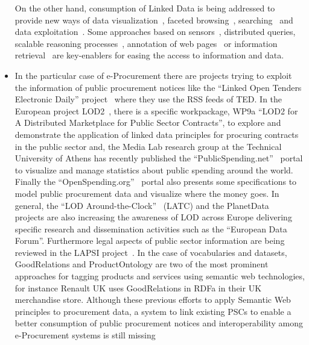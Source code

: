 \begin{itemize}
 On the other hand, consumption of Linked Data is being addressed to provide new ways of data 
 visualization~\cite{DBLP:journals/semweb/DadzieR11,hoga-etal-2011-swse-JWS}, faceted browsing~\cite{Pietriga06fresnel,citeulike:8529753}, 
 searching~\cite{hoga-etal-2011-swse-JWS} and data exploitation~\cite{Harth:2011:SIP:1963192.1963318}. Some approaches 
 based on sensors~\cite{Jeung:2010:EMM:1850003.1850235,ontology-search}, distributed queries\cite{Hartig09executingsparql,Ankolekar07thetwo,sparqlOpt}, 
 scalable reasoning processes~\cite{DBLP:journals/ws/UrbaniKMHB12,DBLP:journals/ws/BonattiHPS11}, 
 annotation of web pages~\cite{rdfa-primer} or information retrieval~\cite{Pound} are key-enablers for easing the access 
 to information and data.
  
 \item In the particular case of e-Procurement there are projects trying to exploit the 
 information of public procurement notices like the ``Linked Open Tenders Electronic Daily'' project~\cite{loted} 
 where they use the RSS feeds of TED. In the European project LOD2~\cite{lod2-project}, there is a specific workpackage, 
 WP9a ``LOD2 for A Distributed Marketplace for Public Sector Contracts'', to explore and demonstrate the 
 application of linked data principles for procuring contracts in the public sector and, 
 the Media Lab research group at the Technical University of Athens has recently published the 
 ``PublicSpending.net''~\cite{publicspending} portal to visualize and manage statistics about public spending around the world. 
 Finally the ``OpenSpending.org''~\cite{open-spending} portal also presents some specifications to model public procurement data and 
 visualize where the money goes. In general, the ``LOD Around-the-Clock''~\cite{latc-project} (LATC) and the PlanetData~\cite{planet-data-project} 
 projects are also increasing the awareness of LOD across Europe delivering specific research and dissemination activities such as the 
 ``European Data Forum''. Furthermore legal aspects of public sector information are being reviewed in the 
 LAPSI project~\cite{lapsi-project}. In the case of vocabularies and datasets, GoodRelations and ProductOntology are two of 
 the most prominent approaches for tagging products and services using semantic web technologies, 
 for instance Renault UK uses GoodRelations in RDFa in their UK merchandise store. Although these previous efforts to apply Semantic Web 
 principles to procurement data, a system to link existing PSCs to enable a better consumption of 
 public procurement notices and interoperability among e-Procurement systems is still missing 

\end{itemize}

